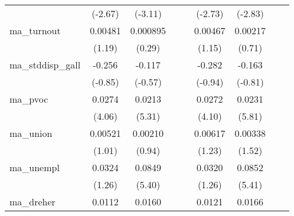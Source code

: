 {\begin{tabular}{l*{8}{c}}
            &     (-2.67)         &     (-3.11)         &                     &                     &     (-2.73)         &     (-2.83)         &                     &                     \\
[1em]
ma\_turnout  &     0.00481         &    0.000895         &                     &                     &     0.00467         &     0.00217         &                     &                     \\
            &      (1.19)         &      (0.29)         &                     &                     &      (1.15)         &      (0.71)         &                     &                     \\
[1em]
ma\_stddisp\_gall&      -0.256         &      -0.117         &                     &                     &      -0.282         &      -0.163         &                     &                     \\
            &     (-0.85)         &     (-0.57)         &                     &                     &     (-0.94)         &     (-0.81)         &                     &                     \\
[1em]
ma\_pvoc     &      0.0274\sym{***}&      0.0213\sym{***}&                     &                     &      0.0272\sym{***}&      0.0231\sym{***}&                     &                     \\
            &      (4.06)         &      (5.31)         &                     &                     &      (4.10)         &      (5.81)         &                     &                     \\
[1em]
ma\_union    &     0.00521         &     0.00210         &                     &                     &     0.00617         &     0.00338         &                     &                     \\
            &      (1.01)         &      (0.94)         &                     &                     &      (1.23)         &      (1.52)         &                     &                     \\
[1em]
ma\_unempl   &      0.0324         &      0.0849\sym{***}&                     &                     &      0.0320         &      0.0852\sym{***}&                     &                     \\
            &      (1.26)         &      (5.40)         &                     &                     &      (1.26)         &      (5.41)         &                     &                     \\
[1em]
ma\_dreher   &      0.0112         &      0.0160\sym{***}&                     &                     &      0.0121         &      0.0166\sym{***}&                     &                     \\

\end{tabular}}
